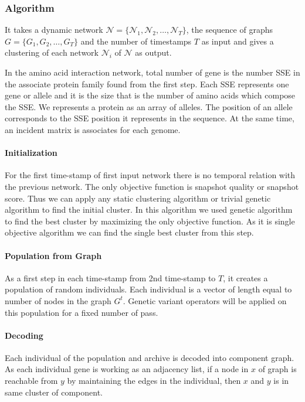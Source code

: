 \subsubsection {Algorithm}
It takes a dynamic network $\mathcal{N} = \{\mathcal{N}_1, \mathcal{N}_2,\ldots,\mathcal{N}_T\}$, the sequence of graphs $G = \{G_1,G_2,\ldots,G_T\}$ and the number of timestamps $T$ as input and gives a clustering of each network $\mathcal{N}_i$ of $\mathcal{N}$ as output.

In the amino acid interaction network, total number of gene is the number SSE in the associate protein family found from the first step. Each SSE represents one gene or allele and it is the size that is the number of amino acids which compose the SSE. We represents a protein as an array of alleles. The position of an allele corresponds to the SSE position it represents in the sequence. At the same time, an incident matrix is associates for each genome.

\paragraph {Initialization}
For the first time-stamp of first input network there is no temporal relation with the previous network. The only objective function is snapshot quality or snapshot score. Thus we can apply any static clustering algorithm or trivial genetic algorithm to find the initial cluster. In this algorithm we used genetic algorithm to find the best cluster by maximizing the only objective function. As it is single objective algorithm we can find the single best cluster from this step.
\paragraph {Population from Graph}
As a first step in each time-stamp from 2nd time-stamp to $T$, it creates a population of random individuals. Each individual is a vector of length equal to number of nodes in the graph $G^t$. Genetic variant operators will be applied on this population for a fixed number of pass.
\paragraph {Decoding}
Each individual of the population and archive is decoded into component graph. As each individual gene is working as an adjacency list, if a node in $x$ of graph is reachable from $y$ by maintaining the edges in the individual, then $x$ and $y$ is in same cluster of component.
